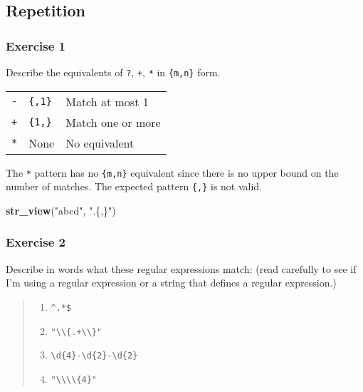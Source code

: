 \documentclass[]{book}
\newenvironment{Shaded}{\begin{snugshade}}{\end{snugshade}}
\newcommand{\KeywordTok}[1]{\textcolor[rgb]{0.13,0.29,0.53}{\textbf{#1}}}
\newcommand{\NormalTok}[1]{#1}
\newcommand{\StringTok}[1]{\textcolor[rgb]{0.31,0.60,0.02}{#1}}
\providecommand{\tightlist}{%
  \setlength{\itemsep}{0pt}\setlength{\parskip}{0pt}}
\theoremstyle{definition}
\theoremstyle{definition}
\theoremstyle{definition}
\theoremstyle{remark}
\begin{document}
\hypertarget{repetition}{%
\subsection{Repetition}\label{repetition}}

\hypertarget{exercise-1-29}{%
\subsubsection{Exercise 1}\label{exercise-1-29}}

Describe the equivalents of \texttt{?}, \texttt{+}, \texttt{*} in
\texttt{\{m,n\}} form.

\begin{longtable}[]{@{}lll@{}}
\toprule
\endhead
\texttt{-} & \texttt{\{,1\}} & Match at most 1\tabularnewline
\texttt{+} & \texttt{\{1,\}} & Match one or more\tabularnewline
\texttt{*} & None & No equivalent\tabularnewline
\bottomrule
\end{longtable}

The \texttt{*} pattern has no \texttt{\{m,n\}} equivalent since there is
no upper bound on the number of matches. The expected pattern
\texttt{\{,\}} is not valid.

\begin{Shaded}
\begin{Highlighting}[]
\KeywordTok{str_view}\NormalTok{(}\StringTok{"abcd"}\NormalTok{, }\StringTok{".\{,\}"}\NormalTok{)}
\end{Highlighting}
\end{Shaded}

\hypertarget{exercise-2-28}{%
\subsubsection{Exercise 2}\label{exercise-2-28}}

Describe in words what these regular expressions match: (read carefully
to see if I'm using a regular expression or a string that defines a
regular expression.)

\begin{quote}
\begin{enumerate}
\def\labelenumi{\arabic{enumi}.}
\tightlist
\item
  \texttt{\^{}.*\$}
\item
  \texttt{"\textbackslash{}\textbackslash{}\{.+\textbackslash{}\textbackslash{}\}"}
\item
  \texttt{\textbackslash{}d\{4\}-\textbackslash{}d\{2\}-\textbackslash{}d\{2\}}
\item
  \texttt{"\textbackslash{}\textbackslash{}\textbackslash{}\textbackslash{}\{4\}"}
\end{enumerate}
\end{quote}
\end{document}

